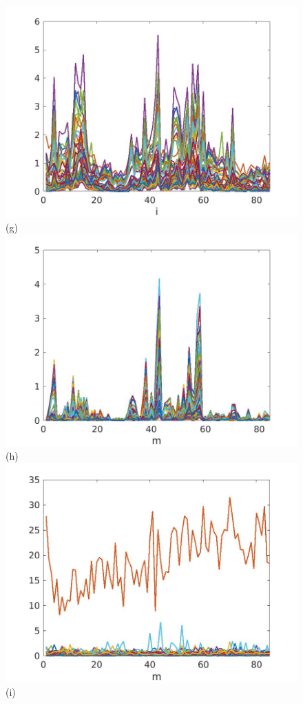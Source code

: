 \documentclass[journal]{IEEEtran}
\begin{document}
\begin{figure}[htp!]
\includegraphics[scale=.12]{../../figs/perc01_J3_VV_sqrdif_change_locations}(g)
\includegraphics[scale=.12]{../../figs/perc01_consecdif_J3_VV_sqrdif_change_locations}(h)\\
\includegraphics[scale=.12]{../../figs/perc01_J3_VV_sqrdif_lowest_cor_locations}(i)

\end{figure}
\end{document}
